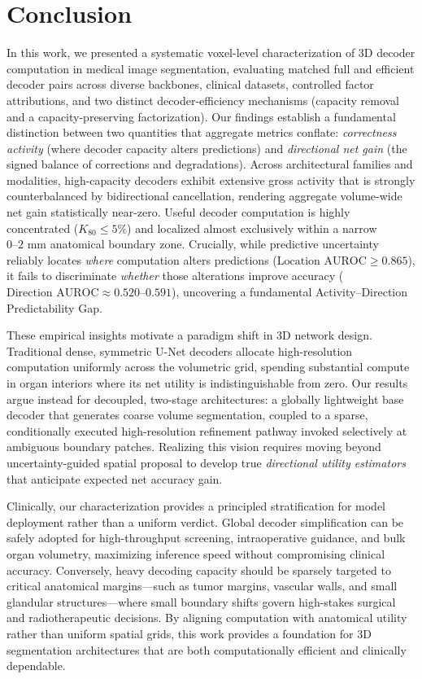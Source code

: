 \section{Conclusion}
\label{sec:conclusion}

In this work, we presented a systematic voxel-level characterization of 3D decoder computation in medical image segmentation, evaluating matched full and efficient decoder pairs across diverse backbones, clinical datasets, controlled factor attributions, and two distinct decoder-efficiency mechanisms (capacity removal and a capacity-preserving factorization). Our findings establish a fundamental distinction between two quantities that aggregate metrics conflate: \textit{correctness activity} (where decoder capacity alters predictions) and \textit{directional net gain} (the signed balance of corrections and degradations). Across architectural families and modalities, high-capacity decoders exhibit extensive gross activity that is strongly counterbalanced by bidirectional cancellation, rendering aggregate volume-wide net gain statistically near-zero. Useful decoder computation is highly concentrated ($K_{80} \le 5\%$) and localized almost exclusively within a narrow $0\text{--}2\text{ mm}$ anatomical boundary zone. Crucially, while predictive uncertainty reliably locates \textit{where} computation alters predictions ($\text{Location AUROC} \ge 0.865$), it fails to discriminate \textit{whether} those alterations improve accuracy ($\text{Direction AUROC} \approx 0.520\text{--}0.591$), uncovering a fundamental Activity--Direction Predictability Gap.

These empirical insights motivate a paradigm shift in 3D network design. Traditional dense, symmetric U-Net decoders allocate high-resolution computation uniformly across the volumetric grid, spending substantial compute in organ interiors where its net utility is indistinguishable from zero. Our results argue instead for decoupled, two-stage architectures: a globally lightweight base decoder that generates coarse volume segmentation, coupled to a sparse, conditionally executed high-resolution refinement pathway invoked selectively at ambiguous boundary patches. Realizing this vision requires moving beyond uncertainty-guided spatial proposal to develop true \textit{directional utility estimators} that anticipate expected net accuracy gain.

Clinically, our characterization provides a principled stratification for model deployment rather than a uniform verdict. Global decoder simplification can be safely adopted for high-throughput screening, intraoperative guidance, and bulk organ volumetry, maximizing inference speed without compromising clinical accuracy. Conversely, heavy decoding capacity should be sparsely targeted to critical anatomical margins---such as tumor margins, vascular walls, and small glandular structures---where small boundary shifts govern high-stakes surgical and radiotherapeutic decisions. By aligning computation with anatomical utility rather than uniform spatial grids, this work provides a foundation for 3D segmentation architectures that are both computationally efficient and clinically dependable.
